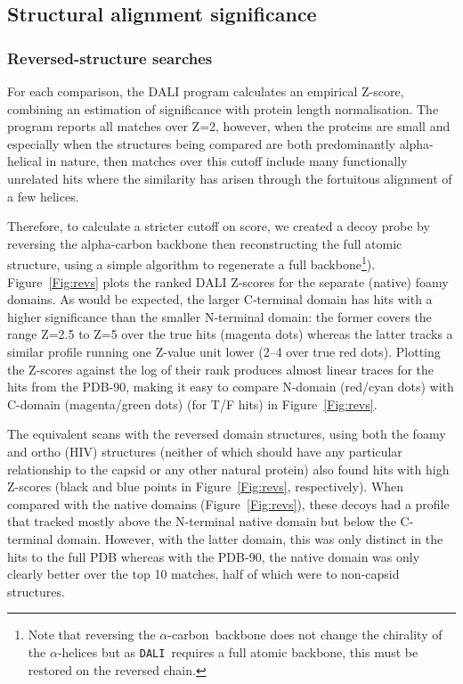 \documentclass[preprint,12pt]{elsarticle}
\newcommand{\A}{$\alpha$}
\newcommand{\CA}{$\alpha$-carbon}
\newcommand{\DALI}{{\tt DALI}}
\newcommand{\Fig}[1]{Figure~\ref{Fig:#1}}
\begin{document}
\subsection{Structural alignment significance}

\subsubsection{Reversed-structure searches}

For each comparison, the DALI program calculates an empirical Z-score, combining an estimation of
significance with protein length normalisation.   The program reports all matches over Z=2, however,
when the proteins are small and especially when the structures being compared are both predominantly
alpha-helical in nature, then matches over this cutoff include many functionally unrelated
hits where the similarity has arisen through the fortuitous alignment of a few helices.

Therefore, to calculate a stricter cutoff on score, we created a decoy probe by reversing the
alpha-carbon backbone then reconstructing the full atomic structure, using a simple algorithm
to regenerate a full backbone\footnote{
Note that reversing the \CA\ backbone does not change the chirality of the \A-helices
but as \DALI\ requires a full atomic backbone, this must be restored on the reversed chain.
}).
\Fig{revs} plots the ranked DALI Z-scores for the separate (native) foamy domains.
As would be expected, the larger C-terminal domain has hits with a higher significance than the
smaller N-terminal domain:  the former covers the range Z=2.5 to Z=5 over the true hits (magenta
dots) whereas the latter tracks a similar profile running one Z-value unit lower (2--4 over true
red dots).  Plotting the Z-scores against the log of their rank produces almost linear traces
for the hits from the PDB-90, making it easy to compare N-domain (red/cyan dots) with C-domain
(magenta/green dots) (for T/F hits) in \Fig{revs}.

The equivalent scans with the reversed domain structures, using both the foamy and ortho (HIV) structures
(neither of which should have any particular relationship to the capsid or any other natural protein)
also found hits with high Z-scores (black and blue points in \Fig{revs}, respectively).
When compared with the native domains (\Fig{revs}), these decoys had a profile that tracked mostly above
the N-terminal native domain but below the C-terminal domain.  However, with the latter domain, this
was only distinct in the hits to the full PDB whereas with the PDB-90, the native domain was only clearly
better over the top 10 matches, half of which were to non-capsid structures.
\end{document}
